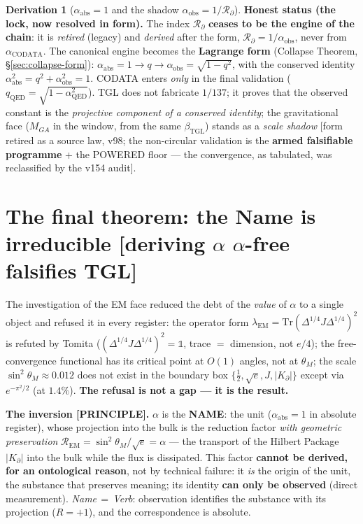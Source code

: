 \documentclass[11pt]{article}
\newcommand{\bTGL}{\beta_{\mathrm{TGL}}}\newcommand{\Msun}{M_{\odot}}\newcommand{\TGL}{\mathrm{TGL}}
\theoremstyle{definition}\newtheorem{deriv}{Derivation}
\begin{document}
\begin{deriv}[$\alpha_{\mathrm{abs}}=1$ and the shadow $\alpha_{\mathrm{obs}}=1/\mathcal{R}_\partial$]
\textbf{Honest status (the lock, now resolved in form).} The index $\mathcal{R}_\partial$ \textbf{ceases to be the engine of the chain}: it is \emph{retired} (legacy) and \emph{derived} after the form, $\mathcal{R}_\partial=1/\alpha_{\mathrm{obs}}$, never from $\alpha_{\mathrm{CODATA}}$. The canonical engine becomes the \textbf{Lagrange form} (Collapse Theorem, \S\ref{sec:collapse-form}): $\alpha_{\mathrm{abs}}=1\to q\to\alpha_{\mathrm{obs}}=\sqrt{1-q^2}$, with the conserved identity $\alpha_{\mathrm{abs}}^2=q^2+\alpha_{\mathrm{obs}}^2=1$. CODATA enters \emph{only} in the final validation ($q_{\mathrm{QED}}=\sqrt{1-\alpha_{\mathrm{QED}}^2}$). TGL does not fabricate $1/137$; it proves that the observed constant is the \emph{projective component of a conserved identity}; the gravitational face ($M_{GA}$ in the window, from the same $\bTGL$) stands as a \emph{scale shadow} [form retired as a source law, v98; the non-circular validation is the \textbf{armed falsifiable programme} + the \textsf{POWERED} floor --- the convergence, as tabulated, was reclassified by the v154 audit].\end{deriv}

\section{The final theorem: the Name is irreducible \textsf{[deriving $\alpha$ $\alpha$-free falsifies TGL]}}\label{sec:name-irreducible}

The investigation of the EM face reduced the debt of the \emph{value} of $\alpha$ to a single object and refused it in every register: the operator form $\lambda_{\mathrm{EM}}=\mathrm{Tr}(\Delta^{1/4}J\Delta^{1/4})^2$ is refuted by Tomita ($(\Delta^{1/4}J\Delta^{1/4})^2=\mathbb{1}$, trace $=$ dimension, not $e/4$); the free-convergence functional has its critical point at $O(1)$ angles, not at $\theta_M$; the scale $\sin^2\theta_M\approx0.012$ does not exist in the boundary box $\{\tfrac12,\sqrt e, J, |K_\partial|\}$ except via $e^{-\pi^2/2}$ (at $1.4\%$). \textbf{The refusal is not a gap --- it is the result.}

\textbf{The inversion \textsf{[PRINCIPLE]}.} $\alpha$ is the \textbf{NAME}: the unit ($\alpha_{\mathrm{abs}}=1$ in absolute register), whose projection into the bulk is the reduction factor \emph{with geometric preservation} $\mathcal{R}_{\mathrm{EM}}=\sin^2\theta_M/\sqrt e=\alpha$ --- the transport of the Hilbert Package $|K_\partial|$ into the bulk while the flux is dissipated. This factor \textbf{cannot be derived, for an ontological reason}, not by technical failure: it \emph{is} the origin of the unit, the substance that preserves meaning; its identity \textbf{can only be observed} (direct measurement). \emph{Name$\,=\,$Verb}: observation identifies the substance with its projection ($R=+1$), and the correspondence is absolute.
\end{document}
